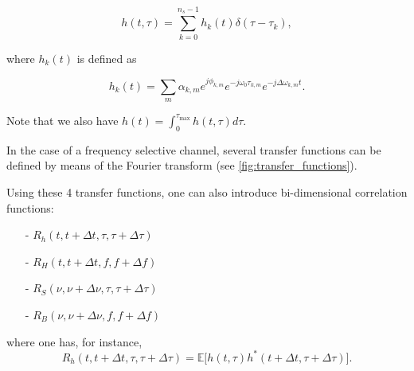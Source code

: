 \documentclass [a4paper, 11pt] {article}
\begin{document}
\begin{reminder}
\begin{itemize}
        \begin{equation}
        h(t,\tau) = \sum_{k=0}^{n_s - 1}h_k(t)\delta(\tau-\tau_k),
        \end{equation}

        where $h_k(t)$ is defined as

        \begin{equation}
        h_k(t) = \sum_m \alpha_{k,m} e^{j\phi_{k,m}}e^{-j\omega_0 \tau_{k,m}}e^{-j\Delta \omega_{k,m} t}.
        \end{equation}



    Note that we also have $h(t) = \int_{0}^{\tau_{\text{max}}} h(t,\tau)d\tau$.

    



    In the case of a frequency selective channel, several transfer functions can be defined by means of the Fourier transform (see \autoref{fig:transfer_functions}).

    

    Using these 4 transfer functions, one can also introduce bi-dimensional correlation functions:

    \begin{minipage}{0.45\textwidth}
    \begin{itemize}
        \item[-] $R_h(t,t+\Delta t, \tau, \tau + \Delta \tau)$
        \item[-] $R_H(t,t+\Delta t, f, f + \Delta f)$
    \end{itemize}
    \end{minipage}
        \hfill
    \begin{minipage}{0.45\textwidth}
    \begin{itemize}
        \item[-] $R_S(\nu,\nu+\Delta \nu, \tau, \tau + \Delta \tau)$
        \item[-] $R_B(\nu,\nu+\Delta \nu, f, f + \Delta f)$
    \end{itemize}
    \end{minipage}

    \medskip


    where one has, for instance,
    \begin{equation}R_h(t,t+\Delta t, \tau, \tau + \Delta \tau) = \mathbb{E}\Big[h(t,\tau)h^*(t+\Delta t,\tau + \Delta \tau)\Big].
    \end{equation}




\end{itemize}
\end{reminder}
\end{document}
